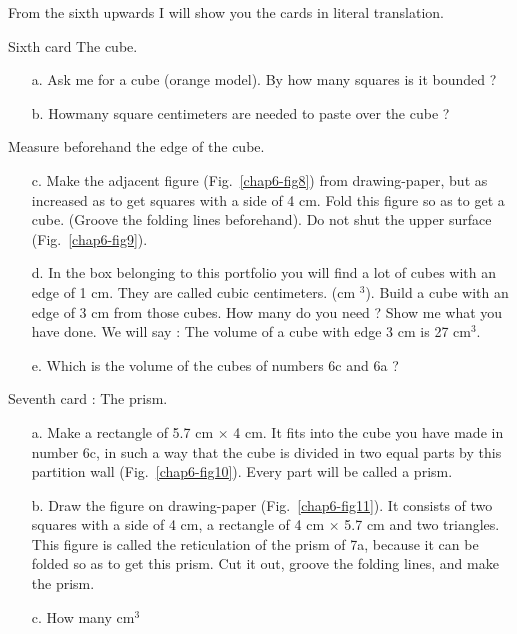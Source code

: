 From the sixth upwards I will show you the cards in literal translation.

\smallskip
Sixth card  The cube.
\begin{itemize}
\item[a.] Ask me for a cube (orange model). By how many squares is it bounded ?

\item[b.] How\pageoriginale many square centimeters are needed to paste over the cube ?
\end{itemize}

Measure beforehand the edge of the cube.
\begin{itemize}
\item[c.] Make the adjacent figure (Fig.~\ref{chap6-fig8}) from drawing-paper, but as increased as to get squares with a side of 4 cm. Fold this figure so as to get a cube. (Groove the folding lines beforehand). Do not shut the upper surface (Fig.~\ref{chap6-fig9}).

\item[d.] In the box belonging to this portfolio you will find a lot of cubes with an edge of 1 cm. They are called cubic centimeters. (cm $^{3}$). Build a cube with an edge of 3 cm from those cubes. How many do you need ? Show me what you have done. We will say : The volume of a cube with edge 3 cm is 27 cm$^{3}$.

\item[e.] Which is the volume of the cubes of numbers 6c and 6a ?
\end{itemize}

\newpage

Seventh card : The prism.

\begin{itemize}
\item[a.] Make a rectangle of 5.7 cm $\times$ 4 cm. It fits into the cube you have made in number 6c, in such a way that the cube is divided in two equal parts by this partition wall (Fig.~\ref{chap6-fig10}). Every part will be called a prism.

\item[b.] Draw the figure on drawing-paper (Fig.~\ref{chap6-fig11}). It consists of two squares with a side of 4 cm, a rectangle of 4 cm $\times$ 5.7 cm and two triangles. This figure is called the reticulation of the prism of 7a, because it can be folded so as to get this prism. Cut it out, groove the folding lines, and make the prism.

\item[c.] How many cm$^{3}$
\end{itemize}

